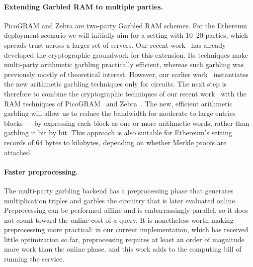 \paragraph{Extending Garbled RAM to multiple parties.}
PicoGRAM and Zebra are two-party Garbled RAM schemes. 
For the Ethereum deployment scenario we
will initially aim for a setting with 10--20 parties, which spreads trust
across a larger set of servers. Our recent work~\cite{mparithgarble} has
already developed the cryptographic groundwork for this extension. Its
techniques make multi-party arithmetic garbling practically efficient,
whereas such garbling was previously mostly of theoretical interest. However,
our earlier work~\cite{mparithgarble}
instantiates the new arithmetic garbling techniques only for circuits. The next step
is therefore to combine the cryptographic techniques of our 
recent work~\cite{mparithgarble}
with the RAM techniques of PicoGRAM~\cite{picogram} and Zebra~\cite{zebra}. 
The new, 
efficient
arithmetic garbling will 
allow us to reduce the bandwidth for
moderate to large entries blocks --- by expressing each block 
as one or more arithmetic words, rather than garbling it bit by bit.  
This approach is also suitable for 
Ethereum's setting records of 64 bytes to kilobytes, 
depending on whether Merkle proofs are attached. 

\paragraph{Faster preprocessing.}
The multi-party garbling backend has a preprocessing phase that generates
multiplication triples and garbles the circuitry that is later evaluated
online. Preprocessing can be performed offline and is embarrassingly
parallel, so it does not count toward the online cost of a query. It is
nonetheless worth making preprocessing more practical: in our current
implementation, which has received little optimization so far,
preprocessing requires at least an order of magnitude more work than the
online phase, and this work adds to the computing bill of running the
service.


